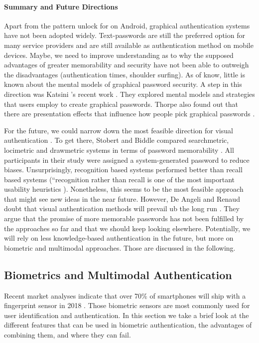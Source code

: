 	\paragraph{Summary and Future Directions}
	Apart from the pattern unlock for on Android, graphical authentication systems have not been adopted widely. Text-passwords are still the preferred option for many service providers and are still available as authentication method on mobile devices. Maybe, we need to improve understanding as to why the supposed advantages of greater memorability and security have not been able to outweigh the disadvantages (authentication times, shoulder surfing). As of know, little is known about the mental models of graphical password security. A step in this direction was Katsini \etal's recent work \cite{Katsini2017StrategiesGraphicalPasswords}. They explored mental models and strategies that users employ to create graphical passwords. Thorpe \etal also found out that there are presentation effects that influence how people pick graphical passwords \cite{Thorpe2014PresentationEffects}. 
	
	For the future, we could narrow down the most feasible direction for visual authentication \cite{Biddle2009GraphicalFirstTwelveYears}. To get there, Stobert and Biddle compared searchmetric, locimetric and drawmetric systems in terms of password memorability \cite{Stobert2013GraphicalPasswords}. All participants in their study were assigned a system-generated password to reduce biases. Unsurprisingly, recognition based systems performed better than recall based systems (``recognition rather than recall is one of the most important usability heuristics \cite{Nielsen1994EnhancingHeuristics}). Nonetheless, this seems to be the most feasible approach that might see new ideas in the near future.
	However, De Angeli and Renaud \etal doubt that visual authentication methods will prevail ub the long run \cite{DeAngeli2005PictureThousandWords, Renaud2009VisualSnakeOil}. They argue that the promise of more memorable passwords has not been fulfilled by the approaches so far and that we should keep looking elsewhere. Potentially, we will rely on less knowledge-based authentication in the future, but more on biometric and multimodal approaches. Those are discussed in the following. 

	\subsection{Biometrics and Multimodal Authentication}
	Recent market analyses indicate that over 70\% of smartphones will ship with a fingerprint sensor in 2018 . Those biometric sensors are most commonly used for user identification and authentication. In this section we take a brief look at the different features that can be used in biometric authentication, the advantages of combining them, and where they can fail. 
	
